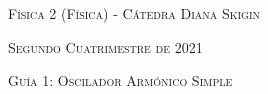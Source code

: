 \documentclass[11pt,spanish]{article}
\begin{document}
    \begin{center}
    \textsc{\large Física 2 (Física) - Cátedra Diana Skigin}
    \par\end{center}{\large \par}
    
    \begin{center}
    \textsc{\large Segundo  Cuatrimestre de 2021}
    \par\end{center}{\large \par}
    
    \begin{center}
    \textsc{\large Guía 1: Oscilador Armónico Simple}
    \par\end{center}{\large \par}
\end{document}
